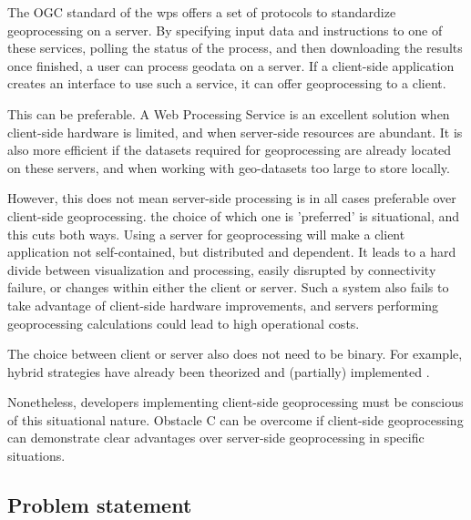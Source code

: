The OGC standard of the \ac{wps} offers a set of protocols to standardize geoprocessing on a server. By specifying input data and instructions to one of these services, polling the status of the process, and then downloading the results once finished, a user can process geodata on a server. If a client-side application creates an interface to use such a service, it can offer geoprocessing to a client.

This can be preferable. A Web Processing Service is an excellent solution when client-side hardware is limited, and when server-side resources are abundant. It is also more efficient if the datasets required for geoprocessing are already located on these servers, and when working with geo-datasets too large to store locally. 

However, this does not mean server-side processing is in all cases preferable over client-side geoprocessing. the choice of which one is 'preferred' is situational, and this cuts both ways. Using a server for geoprocessing will make a client application not self-contained, but distributed and dependent. It leads to a hard divide between visualization and processing, easily disrupted by connectivity failure, or changes within either the client or server. Such a system also fails to take advantage of client-side hardware improvements, and servers performing geoprocessing calculations could lead to high operational costs.

The choice between client or server also does not need to be binary. For example, hybrid strategies have already been theorized and (partially) implemented \cite{panidi_hybrid_2015}.

Nonetheless, developers implementing client-side geoprocessing must be conscious of this situational nature.
Obstacle C can be overcome if client-side geoprocessing can demonstrate clear advantages over server-side geoprocessing in specific situations. 

\newpage
\subsection{Problem statement}



